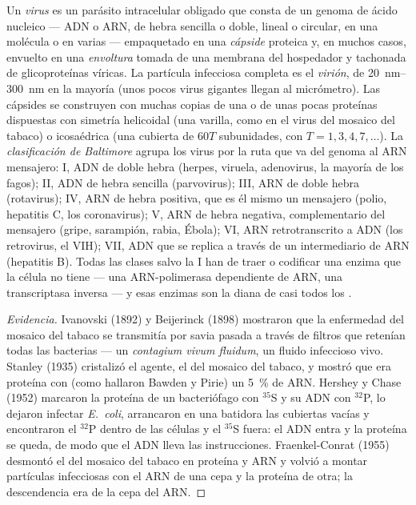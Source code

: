 \begin{definition}[Virus]\label{def:b3:virology:virus}
Un \emph{virus} es un parásito intracelular obligado que consta de un
genoma de ácido nucleico --- ADN o ARN, de hebra sencilla o doble, lineal
o circular, en una molécula o en varias --- empaquetado en una
\emph{cápside} proteica y, en muchos casos, envuelto en una
\emph{envoltura} tomada de una membrana del hospedador y tachonada de
glicoproteínas víricas. La partícula infecciosa completa es el
\emph{virión}, de \qtyrange{20}{300}{nm} en la mayoría (unos pocos virus
gigantes llegan al micrómetro). Las cápsides se construyen con muchas
copias de una o de unas pocas proteínas dispuestas con simetría
helicoidal (una varilla, como en el virus del mosaico del tabaco) o
icosaédrica (una cubierta de $60T$ subunidades, con
$T = 1, 3, 4, 7,\dots$). La \emph{clasificación de Baltimore} agrupa los
virus por la ruta que va del genoma al ARN mensajero: I, ADN de doble
hebra (herpes, viruela, adenovirus, la mayoría de los fagos); II, ADN de
hebra sencilla (parvovirus); III, ARN de doble hebra (rotavirus); IV, ARN
de hebra positiva, que es él mismo un mensajero (polio, hepatitis C, los
coronavirus); V, ARN de hebra negativa, complementario del mensajero
(gripe, sarampión, rabia, Ébola); VI, ARN retrotranscrito a ADN (los
retrovirus, el VIH); VII, ADN que se replica a través de un intermediario
de ARN (hepatitis B). Todas las clases salvo la I han de traer o
codificar una enzima que la célula no tiene --- una ARN-polimerasa
dependiente de ARN, una transcriptasa inversa --- y esas enzimas son la
diana de casi todos los .
\end{definition}

\begin{proof}[Evidencia]
Ivanovski (1892) y Beijerinck (1898) mostraron que la enfermedad del
mosaico del tabaco se transmitía por savia pasada a través de filtros que
retenían todas las bacterias --- un \emph{contagium vivum fluidum}, un
fluido infeccioso vivo. Stanley (1935) cristalizó el agente, el  del
mosaico del tabaco, y mostró que era proteína con (como hallaron Bawden y
Pirie) un \qty{5}{\%} de ARN. Hershey y Chase (1952) marcaron la proteína
de un bacteriófago con $^{35}$S y su ADN con $^{32}$P, lo dejaron
infectar \emph{E.~coli}, arrancaron en una batidora las cubiertas vacías
y encontraron el $^{32}$P dentro de las células y el $^{35}$S fuera: el
ADN entra y la proteína se queda, de modo que el ADN lleva las
instrucciones. Fraenkel-Conrat (1955) desmontó el  del mosaico del
tabaco en proteína y ARN y volvió a montar partículas infecciosas con el
ARN de una cepa y la proteína de otra; la descendencia era de la cepa del
ARN.
\end{proof}

